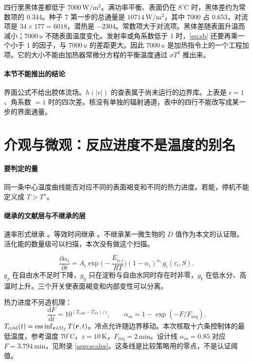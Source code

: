 四行里黑体差都低于 \(7000\,\mathrm{W}/\mathrm{m}^2\)。满功率平衡、表面仍在 \(8^\circ\mathrm{C}\) 时，黑体差约为常数项的 0.344。种子 7 第一步的总通量是 \(10714\,\mathrm{W}/\mathrm{m}^2\)，其中 \(7000\) 占 0.653，对流项是 \(34\times 177=6018\)，潜热是 \(-2304\)。常数项大于对流项。黑体差随表面升温而减小；\(7000\,u\) 不随表面温度变化。发射率或角系数低于 1 时，\eqref{eq:sb} 还要再乘一个小于 1 的因子，与 \(7000\,u\) 的差距更大。因此 \(7000\,u\) 是加热指令上的一个工程加项。它的大小不能由加热器常微分方程的平衡温度通过 \(\sigma T^4\) 推出来。

\paragraph{本节不能推出的结论}
界面公式不给出腔体流场。\(h(|v|)\) 的查表属于尚未运行的边界库。上表是 \(\epsilon=1\)、角系数 \(=1\) 时的四次差。核没有单独的辐射通道，表中的四行不能改写成某一步的界面通量。

\section{介观与微观：反应进度不是温度的别名}

\paragraph{要判定的量}
同一条中心温度曲线能否对应不同的表面褐变和不同的热力进度。若能，停机不能定义成 \(T>T^\star\)。

\paragraph{继承的文献层与不继承的层}
速率形式继承 \cite{vanboekel2008}。等效时间继承 \cite{holdsworth1997}。不继承某一微生物的 \(D\) 值作为本文的认证限。活化能的数量级可以扫描，本次没有做这个扫描。

\begin{equation}
\label{eq:kinetics}
\frac{\partial\alpha_i}{\partial t}
=A_i\exp\!\Big(-\frac{E_{a,i}}{RT}\Big)
(1-\alpha_i)^{n_i}\,g_i(\varepsilon_l,S).
\end{equation}
\(g_p\) 在自由水不足时下降，\(g_g\) 只在淀粉与自由水同时存在时非零，\(g_b\) 在低水分、高温时上升。三个开关使表面褐变和内部变性可以分离。

热力进度不另造机理：
\begin{equation}
\label{eq:F}
\frac{\mathrm{d}F}{\mathrm{d}t}=10^{(T_{\mathrm{cold}}-T_{\mathrm{ref}})/z},\qquad
\alpha_m=1-\exp(-F/F_{\mathrm{req}}).
\end{equation}
\(T_{\mathrm{cold}}(t)=\operatorname{ess\,inf}_{\bm{r}\in\Omega_f}T(\bm{r},t)\)。冷点允许随边界移动。本次核取十六条控制体的最低温度，参考温度 \(70^\circ\mathrm{C}\)，\(z=10\,\mathrm{K}\)，\(F_{\mathrm{req}}=2\,\mathrm{min}\)。设计线 \(\alpha_m=0.85\) 对应 \(F=3.794\,\mathrm{min}\)，见附录 \ref{app:scales}。这条线是比较策略用的零点，不是认证阈值。

